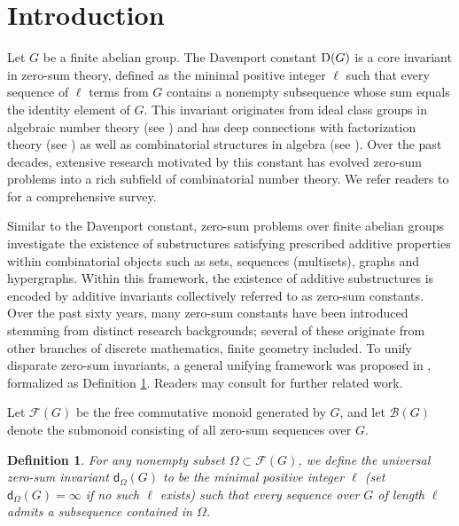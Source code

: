 \documentclass[a4paper, 12pt]{article}
\newtheorem{definition}[theorem]{Definition}
\begin{document}
\section {Introduction}


Let $G$ be a finite abelian group. The Davenport constant ${\rm D}(G)$ is a core invariant in zero-sum theory,
defined as the
minimal positive integer $\ell$ such that every sequence of $\ell$ terms from $G$
contains a nonempty subsequence whose sum equals the identity element of $G$.
 This invariant originates from ideal class groups in algebraic number theory (see \cite{Olson1}) and has deep connections with factorization theory (see
\cite{CziszterDoGerolding, GRuzsa, GH}) as well as combinatorial structures in algebra (see \cite{Grynkiewiczmono}).
Over the past decades, extensive research motivated by this constant has evolved zero-sum problems into a rich subfield of combinatorial number theory. We refer readers to \cite{GaoGeroldingersurvey} for a comprehensive survey.

Similar to the Davenport constant, zero-sum problems over finite abelian groups investigate the existence of substructures satisfying prescribed additive properties within combinatorial objects such as sets, sequences (multisets), graphs and hypergraphs. Within this framework, the existence of additive substructures is encoded by additive invariants collectively referred to as zero-sum constants. Over the past sixty years, many zero-sum constants have been introduced stemming from distinct research backgrounds; several of these originate from other branches of discrete mathematics, finite geometry included. To unify disparate zero-sum invariants, a general unifying framework was proposed in \cite{GaoLiPengWang}, formalized as Definition \ref{definition domenga}. Readers may consult \cite{GaoHong1,GaoHong2} for further related work.





Let $\mathcal F(G)$ be the free commutative monoid generated by $G$, and let $\mathcal B(G)$ denote the submonoid consisting of all zero-sum sequences over $G$.

\begin{definition} \label{definition domenga} \cite{GaoLiPengWang}
For any nonempty subset $\Omega \subset \mathcal F (G)$, we define the universal zero-sum invariant ${\mathsf d}_{\Omega}(G)$ to be the minimal positive integer $\ell$ (set ${\mathsf d}_{\Omega}(G)=\infty$ if no such $\ell$ exists) such that
every sequence over $G$ of length $\ell$ admits a subsequence contained in $\Omega$.
\end{definition}
\end{document}
